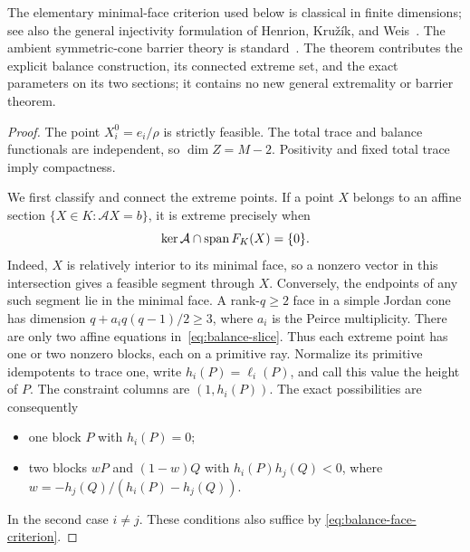 The elementary minimal-face criterion used below is classical in finite
dimensions; see also the general injectivity formulation of
Henrion, Kru\v{z}\'ik, and Weis~\cite[Theorem~2.6]{HKW2026}.
The ambient symmetric-cone barrier theory is standard~\cite{FK1994,GT1998}.
The theorem contributes the explicit balance construction, its
connected extreme set, and the exact parameters on its two sections; it
contains no new general extremality or barrier theorem.

\begin{proof}
The point $X_i^0=e_i/\rho$ is strictly feasible.  The total trace and
balance functionals are independent, so $\dim Z=M-2$.  Positivity
and fixed total trace imply compactness.

We first classify and connect the extreme points.  If a point $X$ belongs
to an affine section $\{X\in K:\mathcal A X=b\}$, it is extreme precisely
when
\begin{equation}\label{eq:balance-face-criterion}
 \ker\mathcal A\cap\operatorname{span} F_K(X)=\{0\}.
\end{equation}
Indeed, $X$ is relatively interior to its minimal face, so a nonzero
vector in this intersection gives a feasible segment through $X$.
Conversely, the endpoints of any such segment lie in the minimal face.
A rank-$q\geq2$ face in a simple Jordan cone has dimension
$q+a_iq(q-1)/2\geq3$, where $a_i$ is the Peirce multiplicity.
There are only two affine equations in~\eqref{eq:balance-slice}.
Thus each extreme point has one or two nonzero blocks, each on a
primitive ray.  Normalize its primitive idempotents to trace one,
write $h_i(P)=\ell_i(P)$, and call this value the height of $P$.
The constraint columns are $(1,h_i(P))$.
The exact possibilities are consequently
\begin{itemize}
 \item one block $P$ with $h_i(P)=0$;
 \item two blocks $wP$ and $(1-w)Q$ with $h_i(P)h_j(Q)<0$,
       where $w=-h_j(Q)/(h_i(P)-h_j(Q))$.
\end{itemize}
In the second case $i\ne j$.  These conditions also suffice by
\eqref{eq:balance-face-criterion}.


\end{proof}
